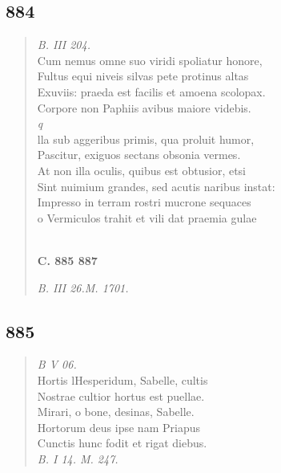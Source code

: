 \documentclass[11pt, a4paper]{report}
\begin{document}
            \subsection*{884}
      \begin{verse}
      \textit{B. III 204.} \\ Cum nemus omne suo viridi spoliatur honore, \\ Fultus equi niveis silvas pete protinus altas \\ Exuviis: praeda est facilis et amoena scolopax. \\ Corpore non Paphiis avibus maiore videbis. \\ \textit{q} \\ lla sub aggeribus primis, qua proluit humor, \\ Pascitur, exiguos sectans obsonia vermes. \\ At non illa oculis, quibus est obtusior, etsi \\ Sint nuimium grandes, sed acutis naribus instat: \\ Impresso in terram rostri mucrone sequaces \\ o Vermiculos trahit et vili dat praemia gulae \\ 
        ﻿\pagebreak 
    \begin{center} \textbf{C. 885 887} \end{center} \marginpar{[332]} \textit{B. III 26.M. 1701.} \\ 
      \end{verse}
  
            \subsection*{885}
      \begin{verse}
      \textit{B V 06.} \\ Hortis lHesperidum, Sabelle, cultis \\ Nostrae cultior hortus est puellae. \\ Mirari, o bone, desinas, Sabelle. \\ Hortorum deus ipse nam Priapus \\ Cunctis hunc fodit et rigat diebus. \\ \textit{B. I 14. M. 247.} \\ 
      \end{verse}
  
\end{document}
